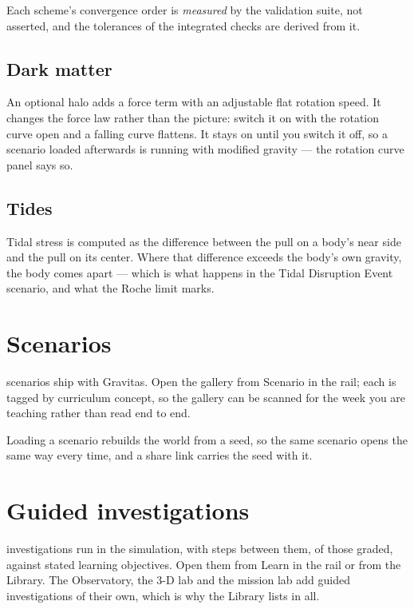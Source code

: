 \documentclass[11pt,a4paper]{article}
\newcommand{\ui}[1]{\textsf{#1}}
\begin{document}
Each scheme's convergence order is \emph{measured} by the validation suite, not
asserted, and the tolerances of the integrated checks are derived from it.

\subsection{Dark matter}

An optional halo adds a force term with an adjustable flat rotation speed. It
changes the force law rather than the picture: switch it on with the rotation
curve open and a falling curve flattens. It stays on until you switch it off, so
a scenario loaded afterwards is running with modified gravity --- the rotation
curve panel says so.

\subsection{Tides}

Tidal stress is computed as the difference between the pull on a body's near side
and the pull on its center. Where that difference exceeds the body's own gravity,
the body comes apart --- which is what happens in the Tidal Disruption Event
scenario, and what the Roche limit marks.

\section{Scenarios}

\GravScenarios{} scenarios ship with Gravitas. Open the gallery from
\ui{Scenario} in the rail; each is tagged by curriculum concept, so the gallery
can be scanned for the week you are teaching rather than read end to end.

Loading a scenario rebuilds the world from a seed, so the same scenario opens the
same way every time, and a share link carries the seed with it.



\section{Guided investigations}

\GravInvestigations{} investigations run in the simulation, with
\GravInvestigationSteps{} steps between them, \GravGradedSteps{} of those
graded, against \GravObjectives{} stated learning objectives. Open them from
\ui{Learn} in the rail or from the Library. The Observatory, the 3-D lab and the
mission lab add \GravGuidedInvestigations{} guided investigations of their own,
which is why the Library lists \GravLibraryInvestigations{} in all.
\end{document}
